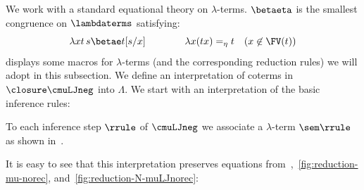 We work with a standard equational theory on $\lambda$-terms. 
$\betaeta$ is the smallest congruence on $\lambdaterms$ satisfying:
\[
\lambda x t\,  s \betae  t[s/x] \qquad \qquad \lambda x ( tx) =_\eta t \quad (x \not \in  \FV(t))
\]
 displays some macros for $\lambda$-terms (and the corresponding reduction rules) we will adopt in this subsection.
 We define an interpretation of coterms in $\closure \cmuLJneg$ into $\Lambda$.  
 We start with an interpretation of the basic inference rules: 


 \begin{defn} To each inference step $\rrule$ of $\cmuLJneg$ we associate a $\lambda$-term  $\sem \rrule$ as shown in~. 
 \end{defn}
 
It is easy to see that this interpretation preserves equations from~,~\ref{fig:reduction-mu-norec}, and~\ref{fig:reduction-N-muLJnorec}:

 

